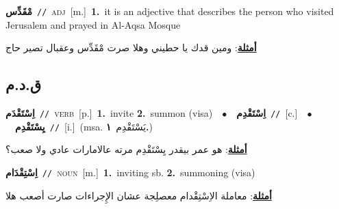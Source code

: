 \documentclass[10pt,a4paper,twoside]{article} %
\begin{document}
\begin{multicols}{2}
{\setlength\topsep{0pt}\textbf{\foreignlanguage{arabic}{مْقَدِّس}}\ {\color{gray}\texttt{//}\color{black}}\ \textsc{adj}\ [m.]\ \textbf{1.}~it is an adjective that describes the person who visited Jerusalem and prayed in Al-Aqsa Mosque\  \begin{flushright}\color{gray}\foreignlanguage{arabic}{\textbf{\underline{\foreignlanguage{arabic}{أمثلة}}}: ومين قدك يا حطيني وهلا صرت مْقَدِّس وعقبال تصير حاج}\end{flushright}\color{black}} \vspace{2mm}

\vspace{-3mm}
\subsection*{\color{blue}\foreignlanguage{arabic}{ق.د.م}\color{blue}{}} 

{\setlength\topsep{0pt}\textbf{\foreignlanguage{arabic}{اِسْتَقْدَم}}\ {\color{gray}\texttt{//}\color{black}}\ \textsc{verb}\ [p.]\ \textbf{1.}~invite  \textbf{2.}~summon (visa)\ \ $\bullet$\ \ \setlength\topsep{0pt}\textbf{\foreignlanguage{arabic}{اِسْتَقْدِم}}\ {\color{gray}\texttt{//}\color{black}}\ [c.]\ \ $\bullet$\ \ \setlength\topsep{0pt}\textbf{\foreignlanguage{arabic}{يِسْتَقْدِم}}\ {\color{gray}\texttt{//}\color{black}}\ [i.]\ \color{gray}(msa. \foreignlanguage{arabic}{يَسْتَقْدِم}~\foreignlanguage{arabic}{\textbf{١.}})\color{black}\  \begin{flushright}\color{gray}\foreignlanguage{arabic}{\textbf{\underline{\foreignlanguage{arabic}{أمثلة}}}: هو عمر بيقدر يِسْتَقْدِم مرته عالامارات عادي ولا صعب؟}\end{flushright}\color{black}} \vspace{2mm}

{\setlength\topsep{0pt}\textbf{\foreignlanguage{arabic}{اِسْتِقْدَام}}\ {\color{gray}\texttt{//}\color{black}}\ \textsc{noun}\ [m.]\ \textbf{1.}~inviting sb.  \textbf{2.}~summoning (visa)\  \begin{flushright}\color{gray}\foreignlanguage{arabic}{\textbf{\underline{\foreignlanguage{arabic}{أمثلة}}}: معاملة الاِسْتِقْدام معصلِجة عشان الإِجراءات صارت أصعب هلا}\end{flushright}\color{black}} \vspace{2mm}


\end{multicols}
\end{document}
